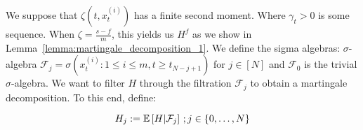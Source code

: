 We suppose that $\zeta(t,x_t^{(i)})$ has a finite second moment. Where $\gamma_{t} > 0$ is some sequence. When $\zeta = \frac{s-f}{m}$, this yields us $H^f$ as we show in Lemma~\ref{lemma:martingale_decomposition_1}. We define the sigma algebras: $\sigma$-algebra $\mathcal{F}_j = \sigma(x^{(i)}_{t}: 1\leq i\leq m, t \geq t_{N-j+1})$ for $j \in [N]$ and $\mathcal{F}_0$ is the trivial $\sigma$-algebra. We want to filter $H$ through the filtration $\mathcal{F}_j$ to obtain a martingale decomposition. To this end, define:

\begin{equation}
 H_{j} := \mathbb{E}\left[H|\mathcal{F}_{j}\right] \,; j \in \{0,\dots,N\} 
\end{equation}


